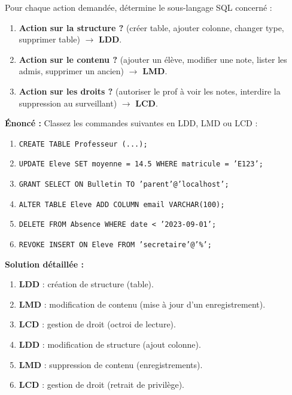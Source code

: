\documentclass[11pt]{article}
\begin{document}
\begin{methode}
Pour chaque action demandée, détermine le sous-langage SQL concerné :
\begin{enumerate}
    \item \textbf{Action sur la structure ?} (créer table, ajouter colonne, changer type, supprimer table) $\rightarrow$ \textbf{LDD}.
    \item \textbf{Action sur le contenu ?} (ajouter un élève, modifier une note, lister les admis, supprimer un ancien) $\rightarrow$ \textbf{LMD}.
    \item \textbf{Action sur les droits ?} (autoriser le prof à voir les notes, interdire la suppression au surveillant) $\rightarrow$ \textbf{LCD}.
\end{enumerate}
\end{methode}

\begin{exoresolu}
\textbf{Énoncé :} Classez les commandes suivantes en LDD, LMD ou LCD :
\begin{enumerate}
    \item \texttt{CREATE TABLE Professeur (...);}
    \item \texttt{UPDATE Eleve SET moyenne = 14.5 WHERE matricule = 'E123';}
    \item \texttt{GRANT SELECT ON Bulletin TO 'parent'@'localhost';}
    \item \texttt{ALTER TABLE Eleve ADD COLUMN email VARCHAR(100);}
    \item \texttt{DELETE FROM Absence WHERE date < '2023-09-01';}
    \item \texttt{REVOKE INSERT ON Eleve FROM 'secretaire'@'\%';}
\end{enumerate}

\tcblower
\textbf{Solution détaillée :}
\begin{enumerate}
    \item \textbf{LDD} : création de structure (table).
    \item \textbf{LMD} : modification de contenu (mise à jour d'un enregistrement).
    \item \textbf{LCD} : gestion de droit (octroi de lecture).
    \item \textbf{LDD} : modification de structure (ajout colonne).
    \item \textbf{LMD} : suppression de contenu (enregistrements).
    \item \textbf{LCD} : gestion de droit (retrait de privilège).
\end{enumerate}
\end{exoresolu}
\end{document}
